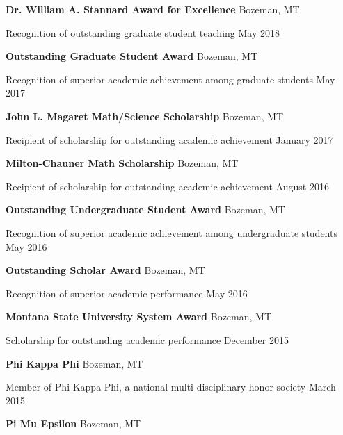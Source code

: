 \documentclass[a4paper]{article}
\begin{document}
\textbf{Dr. William A. Stannard Award for Excellence} \hfill Bozeman, MT

Recognition of outstanding graduate student teaching \hfill May 2018

\vspace*{2mm}

\textbf{Outstanding Graduate Student Award} \hfill Bozeman, MT

Recognition of superior academic achievement among graduate students
\hfill May 2017

\vspace*{2mm}

\textbf{John L. Magaret Math/Science Scholarship} \hfill Bozeman, MT

Recipient of scholarship for outstanding academic achievement
\hfill January 2017

\vspace*{2mm}

\textbf{Milton-Chauner Math Scholarship} \hfill Bozeman, MT

Recipient of scholarship for outstanding academic achievement
\hfill August 2016

\vspace*{2mm}

\textbf{Outstanding Undergraduate Student Award} \hfill Bozeman, MT

Recognition of superior academic achievement among undergraduate
students \hfill May 2016

\vspace*{2mm}

\textbf{Outstanding Scholar Award} \hfill Bozeman, MT

Recognition of superior academic performance \hfill May 2016

\vspace*{2mm}

\textbf{Montana State University System Award} \hfill Bozeman, MT

Scholarship for outstanding academic performance \hfill December 2015

\vspace*{2mm}

\textbf{Phi Kappa Phi} \hfill Bozeman, MT

Member of Phi Kappa Phi, a national multi-disciplinary honor society
\hfill March 2015

\vspace*{2mm}

\textbf{Pi Mu Epsilon} \hfill Bozeman, MT
\end{document}
